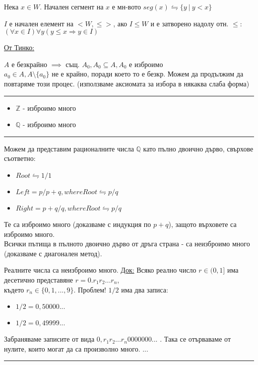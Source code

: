\documentclass[fleqn, titlepage, 12pt]{report}
\begin{document}
 Нека $ x \in W $. Начален сегмент на $ x $ е мн-вото
$ seg(x) \leftrightharpoons \{y\ |\ y < x\}$
\bigbreak

 $ I $ е начален елемент на $ <W, \leq> $, ако $ I \leq W $ и е затворено надолу отн. $ \leq $:\\
$ (\forall{x \in I})\forall{y}(y \leq x \Rightarrow y \in I) $
\bigbreak

\underline{От Тинко:}
\bigbreak

$ A $ е безкрайно $ \implies $ същ. $ A_0, A_0 \subseteq A, A_0$ е изброимо\\
$ a_0 \in A, A \setminus \{ a_0 \} $ не е крайно, поради което то е безкр. Можем да продължим да повтаряме този процес.
(използваме аксиомата за избора в някаква слаба форма)

\bigbreak
\hrule
\bigbreak

\begin{itemize}
  \item $ \mathbb{Z} $ - изброимо много
  \item $ \mathbb{Q} $ - изброимо много
\end{itemize}

\bigbreak
\hrule
\bigbreak

Можем да представим рационалните числа $ \mathbb{Q} $ като пълно двоично дърво, свърхове съответно:
\begin{itemize}
  \item $ Root \leftrightharpoons 1/1$
  \item $ Left = p / p + q, where Root \leftrightharpoons p / q $
  \item $ Right = p + q / q, where Root \leftrightharpoons p / q $
\end{itemize}

Те са изброимо много (доказваме с индукция по $ p + q $), защото върховете са изброимо много.\\
Всички пътища в пълното двоично дърво от дръга страна - са неизброимо много (доказваме с диагонален метод).
\bigbreak

  Реалните числа са неизброимо много.
\bigbreak
\underline{Док:} Всяко реално число $ r \in (0, 1] $ има десетично представяне $ r = 0. r_1 r_2 ... r_n $,\\
където $ r_n \in \{ 0, 1, ... , 9 \}  $.
\bigbreak
Проблем! $ 1/2 $ има два записа:
\begin{itemize}
  \item $ 1/2 = 0,50000... $
  \item $ 1/2 = 0,49999... $
\end{itemize}
Забраняваме записите от вида $ 0, r_1 r_2 ... r_n 0000000... $ .
Така се отърваваме от нулите, които могат да са произволно много.
...
\bigbreak
\hrule
\bigbreak
\end{document}
